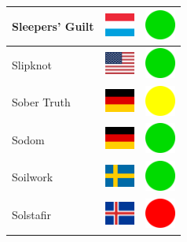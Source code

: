 \documentclass[12pt, a4paper, twoside]{report}
\begin{document}
\begin{center}
\begin{longtable}{|p{5cm}|p{2cm}|p{2cm}|}
Sleepers' Guilt & \includegraphics[width=1cm]{4x3/lu} & \includegraphics[width=1cm]{likes/y} \\ \hline
Slipknot & \includegraphics[width=1cm]{4x3/us} & \includegraphics[width=1cm]{likes/y} \\ \hline
Sober Truth & \includegraphics[width=1cm]{4x3/de} & \includegraphics[width=1cm]{likes/m} \\ \hline
Sodom & \includegraphics[width=1cm]{4x3/de} & \includegraphics[width=1cm]{likes/y} \\ \hline
Soilwork & \includegraphics[width=1cm]{4x3/se} & \includegraphics[width=1cm]{likes/y} \\ \hline
Solstafir & \includegraphics[width=1cm]{4x3/is} & \includegraphics[width=1cm]{likes/n} \\ \hline

\end{longtable}
\end{center}
\end{document}

